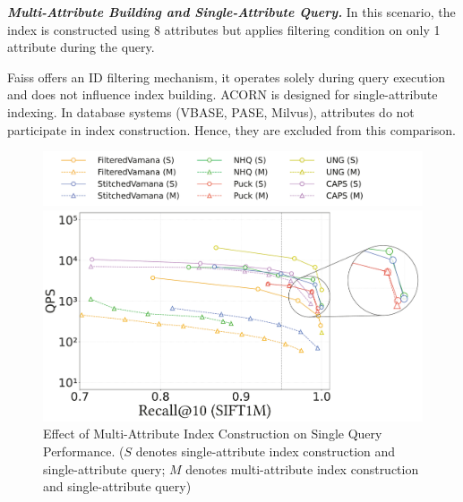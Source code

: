 \documentclass[sigconf, nonacm]{acmart}
\begin{document}
	\textit{\textbf{Multi-Attribute Building and Single-Attribute Query.}}
	In this scenario, the index is constructed using 8 attributes but applies filtering condition on only 1 attribute during the query.
	
	Faiss offers an ID filtering mechanism, it operates solely during query execution and does not influence index building. ACORN is   designed for single-attribute indexing. In database systems (VBASE, PASE, Milvus), 
	attributes do not participate in index construction.
	Hence, they are excluded from this comparison.
	
	\begin{figure}[t]
		\centering
		
		\hspace*{15pt} %
		\includegraphics[width=0.85\columnwidth]{figures/exp/exp_2_legend.pdf} %
		
		
		\includegraphics[width=0.7\columnwidth]{figures/exp/exp_2_1.pdf}
		\caption{Effect of Multi-Attribute Index Construction on Single Query Performance. ($S$ denotes single-attribute index construction and single-attribute query; $M$ denotes multi-attribute index construction and single-attribute query)}
		\label{fig:exp_2_1}
		
	\end{figure}
	
\end{document}
